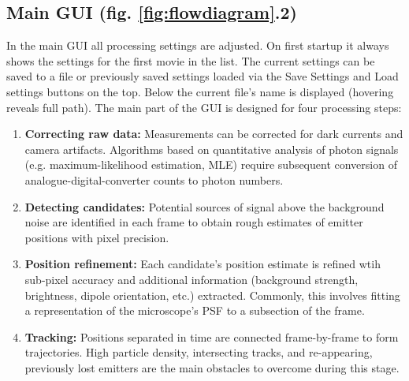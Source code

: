 \documentclass[11pt,onside]{report}
\numberwithin{equation}{chapter}
\begin{document}
\subsection*{Main GUI (fig. \ref{fig:flowdiagram}.2)}
In the main GUI all processing settings are adjusted. On first startup it always shows the settings for the first movie in the list. The current settings can be saved to a file or previously saved settings loaded via the \textsf{Save Settings} and \textsf{Load settings} buttons on the top. Below the current file's name is displayed (hovering reveals full path). The main part of the GUI is designed for four processing steps:
\begin{enumerate}
 \item \textbf{Correcting raw data:} Measurements can be corrected for dark currents and camera artifacts. Algorithms based on quantitative analysis of photon signals (e.g. maximum-likelihood estimation, MLE) require subsequent conversion of analogue-digital-converter counts to photon numbers.
 \item \textbf{Detecting candidates:} Potential sources of signal above the background noise are identified in each frame to obtain rough estimates of emitter positions with pixel precision. %
  \item \textbf{Position refinement:} Each candidate's position estimate is refined wtih sub-pixel accuracy and additional information (background strength, brightness, dipole orientation, etc.) extracted. Commonly, this involves fitting a representation of the microscope's PSF to a subsection of the frame.
    \item \textbf{Tracking:} Positions separated in time are connected frame-by-frame to form trajectories. High particle density, intersecting tracks, and re-appearing, previously lost emitters are the main obstacles to overcome during this stage.
\end{enumerate}
\end{document}
